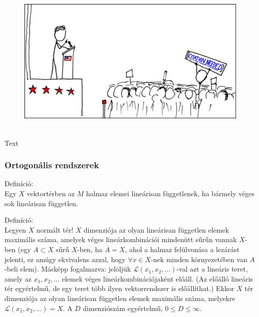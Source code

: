 \documentclass[12pt,a4paper]{scrartcl}
\newenvironment{definicio}{}{}
\newenvironment{ajanlofig}{\begin{figure}\begin{center}}{
\end{center}\end{figure}}
\begin{document}
\begin{ajanlo}

\begin{ajanlofig}

\href{https://xkcd.com}{\includegraphics[width=5.20833in,height=2.82292in]{wikipedian_protester.png}}

\end{ajanlofig}

Text

\end{ajanlo}

\hypertarget{ortogonalis-rendszerek}{%
\subsubsection{Ortogonális rendszerek}\label{ortogonalis-rendszerek}}

\begin{definicio}

Definíció:\\
Egy \(X\) vektortérben az \(M\) halmaz elemei lineárisan függetlenek, ha
bármely véges sok lineárisan független.

\end{definicio}

\begin{definicio}

Definíció:\\
Legyen \(X\) normált tér! \(X\) dimenziója az olyan lineárisan független
elemek maximális száma, amelyek véges lineárkombinációi mindenütt sűrűn
vannak \(X\)-ben (egy \(A \subset X\) sűrű \(X\)-ben, ha
\(\overline{A} = X\), ahol a halmaz felülvonása a lezárást jelenti, ez
amúgy ekvivalens azzal, hogy \(\forall x \in X\)-nek minden
környezetében van \(A\)-beli elem). Másképp fogalmazva: jelöljük
\(\mathcal{L}\left( {x_{1},x_{2},...} \right)\)-val azt a lineáris
teret, amely az \(x_{1},x_{2},...\) elemek véges lineárkombinációjaként
előáll. (Az előálló lineáris tér egyértelmű, de egy teret több ilyen
vektorrendszer is előállíthat.) Ekkor \(X\) tér dimenziója az olyan
lineárisan független elemek maximális száma, melyekre
\(\overline{\mathcal{L}\left( {x_{1},x_{2},...} \right)} = X\). A \(D\)
dimenziószám egyértelmű, \(0 \leq D \leq \infty\).

\end{definicio}
\end{document}
